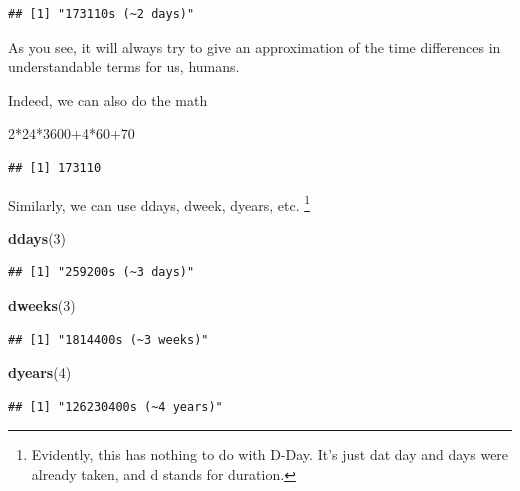 \documentclass[]{tufte-book}
\newenvironment{Shaded}{}{}
\newcommand{\DecValTok}[1]{\textcolor[rgb]{0.25,0.63,0.44}{#1}}
\newcommand{\KeywordTok}[1]{\textcolor[rgb]{0.00,0.44,0.13}{\textbf{#1}}}
\newcommand{\NormalTok}[1]{#1}
\newcommand{\OperatorTok}[1]{\textcolor[rgb]{0.40,0.40,0.40}{#1}}
\begin{document}
\begin{verbatim}
## [1] "173110s (~2 days)"
\end{verbatim}

As you see, it will always try to give an approximation of the time differences in understandable terms for us, humans.

Indeed, we can also do the math

\begin{Shaded}
\begin{Highlighting}[]
\DecValTok{2}\OperatorTok{*}\DecValTok{24}\OperatorTok{*}\DecValTok{3600}\OperatorTok{+}\DecValTok{4}\OperatorTok{*}\DecValTok{60}\OperatorTok{+}\DecValTok{70}
\end{Highlighting}
\end{Shaded}

\begin{verbatim}
## [1] 173110
\end{verbatim}

Similarly, we can use ddays, dweek, dyears, etc. \footnote{Evidently, this has nothing to do with D-Day. It's just dat day and days were already taken, and d stands for duration.}

\begin{Shaded}
\begin{Highlighting}[]
\KeywordTok{ddays}\NormalTok{(}\DecValTok{3}\NormalTok{)}
\end{Highlighting}
\end{Shaded}

\begin{verbatim}
## [1] "259200s (~3 days)"
\end{verbatim}

\begin{Shaded}
\begin{Highlighting}[]
\KeywordTok{dweeks}\NormalTok{(}\DecValTok{3}\NormalTok{)}
\end{Highlighting}
\end{Shaded}

\begin{verbatim}
## [1] "1814400s (~3 weeks)"
\end{verbatim}

\begin{Shaded}
\begin{Highlighting}[]
\KeywordTok{dyears}\NormalTok{(}\DecValTok{4}\NormalTok{)}
\end{Highlighting}
\end{Shaded}

\begin{verbatim}
## [1] "126230400s (~4 years)"
\end{verbatim}
\end{document}
